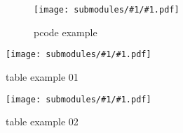 \documentclass[conference]{IEEEtran}
\begin{document}
\newcommand{\includeSubmodule}[3]{
    \begin{figure#3}[!htb]
        \begin{center}
            \texttt{[image: submodules/\#1/\#1.pdf]}
        \end{center} 
        \caption{#2}
    \end{figure#3}
}

\lipsum[1]
\includeSubmodule{4}{pcode example}{}
\lipsum[1]
\includeSubmodule{5}{table example 01}{*}
\lipsum[1]
\includeSubmodule{6}{table example 02}{*}
\lipsum[1]



\end{document}
